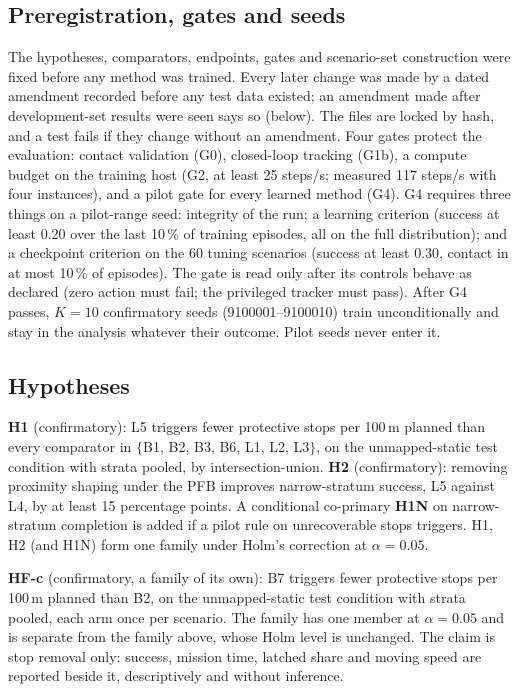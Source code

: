 \documentclass[11pt]{article}
\theoremstyle{definition}
\begin{document}
\subsection{Preregistration, gates and seeds}
The hypotheses, comparators, endpoints, gates and scenario-set construction were fixed before any method
was trained. Every later change was made by a dated amendment recorded before any test data existed; an
amendment made after development-set results were seen says so (below). The files are locked by hash, and a
test fails if they change without an amendment. Four gates protect the evaluation: contact validation (G0),
closed-loop tracking (G1b), a compute budget on the training host (G2, at least 25 steps/s; measured 117 steps/s with
four instances), and a pilot gate for every learned method (G4). G4 requires three things on a pilot-range seed:
integrity of the run; a learning criterion (success at least 0.20 over the last 10\,\% of training episodes, all on the
full distribution); and a checkpoint criterion on the 60 tuning scenarios (success at least 0.30, contact in at most
10\,\% of episodes). The gate is read only after its controls behave as declared (zero action must fail; the privileged
tracker must pass). After G4 passes, $K=10$ confirmatory seeds (9100001--9100010) train unconditionally and stay in the
analysis whatever their outcome. Pilot seeds never enter it.

\subsection{Hypotheses}
\textbf{H1} (confirmatory): L5 triggers fewer protective stops per 100\,m planned than every comparator in
$\{$B1, B2, B3, B6, L1, L2, L3$\}$, on the unmapped-static test condition with strata pooled, by
intersection-union. \textbf{H2} (confirmatory): removing proximity shaping under the PFB improves
narrow-stratum success, L5 against L4, by at least 15 percentage points. A conditional co-primary
\textbf{H1N} on narrow-stratum completion is added if a pilot rule on unrecoverable stops triggers. H1, H2
(and H1N) form one family under Holm's correction at $\alpha=0.05$.

\textbf{HF-c} (confirmatory, a family of its own): B7 triggers fewer protective stops per 100\,m planned than
B2, on the unmapped-static test condition with strata pooled, each arm once per scenario. The family has one
member at $\alpha=0.05$ and is separate from the family above, whose Holm level is unchanged. The claim is
stop removal only: success, mission time, latched share and moving speed are reported beside it,
descriptively and without inference.
\end{document}
